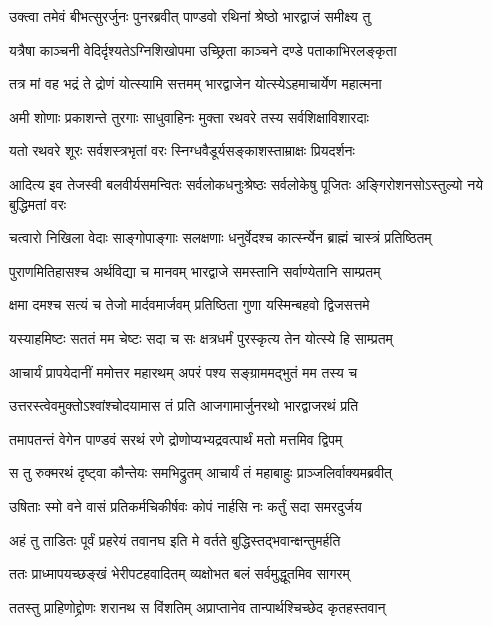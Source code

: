 \twolineshloka
{उक्त्वा तमेवं बीभत्सुरर्जुनः पुनरब्रवीत्}
{पाण्डवो रथिनां श्रेष्ठो भारद्वाजं समीक्ष्य तु}


\twolineshloka
{यत्रैषा काञ्चनी वेदिर्दृश्यतेऽग्निशिखोपमा}
{उच्छ्रिता काञ्चने दण्डे पताकाभिरलङ्कृता}


\twolineshloka
{तत्र मां वह भद्रं ते द्रोणं योत्स्यामि सत्तमम्}
{भारद्वाजेन योत्स्येऽहमाचार्येण महात्मना}


\twolineshloka
{अमी शोणाः प्रकाशन्ते तुरगाः साधुवाहिनः}
{मुक्ता रथवरे तस्य सर्वशिक्षाविशारदाः}


\twolineshloka
{यतो रथवरे शूरः सर्वशस्त्रभृतां वरः}
{स्निग्धवैडूर्यसङ्काशस्ताम्राक्षः प्रियदर्शनः}


\threelineshloka
{आदित्य इव तेजस्वी बलवीर्यसमन्वितः}
{सर्वलोकधनुःश्रेष्ठः सर्वलोकेषु पूजितः}
{अङ्गिरोशनसोऽस्तुल्यो नये बुद्धिमतां वरः}


\twolineshloka
{चत्वारो निखिला वेदाः साङ्गोपाङ्गाः सलक्षणाः}
{धनुर्वेदश्च कार्त्स्न्येन ब्राह्मं चास्त्रं प्रतिष्ठितम्}


\twolineshloka
{पुराणमितिहासश्च अर्थविद्या च मानवम्}
{भारद्वाजे समस्तानि सर्वाण्येतानि साम्प्रतम्}


\twolineshloka
{क्षमा दमश्च सत्यं च तेजो मार्दवमार्जवम्}
{प्रतिष्ठिता गुणा यस्मिन्बहवो द्विजसत्तमे}


\twolineshloka
{यस्याहमिष्टः सततं मम चेष्टः सदा च सः}
{क्षत्रधर्मं पुरस्कृत्य तेन योत्स्ये हि साम्प्रतम्}


\twolineshloka
{आचार्यं प्रापयेदानीं ममोत्तर महारथम्}
{अपरं पश्य सङ्ग्राममद्भुतं मम तस्य च}


\twolineshloka
{उत्तरस्त्वेवमुक्तोऽश्वांश्चोदयामास तं प्रति}
{आजगामार्जुनरथो भारद्वाजरथं प्रति}


\twolineshloka
{तमापतन्तं वेगेन पाण्डवं सरथं रणे}
{द्रोणोप्यभ्यद्रवत्पार्थं मतो मत्तमिव द्विपम्}


\twolineshloka
{स तु रुक्मरथं दृष्ट्वा कौन्तेयः समभिद्रुतम्}
{आचार्यं तं महाबाहुः प्राञ्जलिर्वाक्यमब्रवीत्}


\twolineshloka
{उषिताः स्मो वने वासं प्रतिकर्मचिकीर्षवः}
{कोपं नार्हसि नः कर्तुं सदा समरदुर्जय}


\twolineshloka
{अहं तु ताडितः पूर्वं प्रहरेयं तवानघ}
{इति मे वर्तते बुद्धिस्तद्भवान्क्षन्तुमर्हति}


\twolineshloka
{ततः प्राध्मापयच्छङ्खं भेरीपटहवादितम्}
{व्यक्षोभत बलं सर्वमुद्धूतमिव सागरम्}



\twolineshloka
{ततस्तु प्राहिणोद्द्रोणः शरानथ स विंशतिम्}
{अप्राप्तानेव तान्पार्थश्चिच्छेद कृतहस्तवान्}


